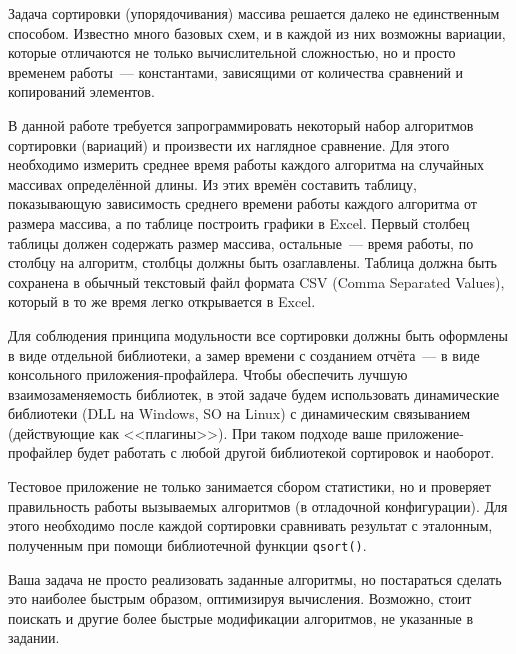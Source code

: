
Задача сортировки (упорядочивания) массива решается далеко не единственным способом. Известно много
базовых схем, и в каждой из них возможны вариации, которые отличаются не только вычислительной
сложностью, но и просто временем работы~--- константами, зависящими от количества сравнений и
копирований элементов.

В данной работе требуется запрограммировать некоторый набор алгоритмов сортировки (вариаций) и
произвести их наглядное сравнение. Для этого необходимо измерить среднее время работы каждого
алгоритма на случайных массивах определённой длины. Из этих времён составить таблицу, показывающую
зависимость среднего времени работы каждого алгоритма от размера массива, а по таблице построить
графики в Excel. Первый столбец таблицы должен содержать размер массива, остальные~--- время работы,
по столбцу на алгоритм, столбцы должны быть озаглавлены. Таблица должна быть сохранена в обычный
текстовый файл формата CSV (Comma Separated Values), который в то же время легко открывается в
Excel.

Для соблюдения принципа модульности все сортировки должны быть оформлены в виде отдельной
библиотеки, а замер времени с созданием отчёта~--- в виде консольного приложения-профайлера. Чтобы
обеспечить лучшую взаимозаменяемость библиотек, в этой задаче будем использовать динамические
библиотеки (DLL на Windows, SO на Linux) с динамическим связыванием (действующие как <<плагины>>).
При таком подходе ваше приложение-профайлер будет работать с любой другой библиотекой сортировок и
наоборот.

Тестовое приложение не только занимается сбором статистики, но и проверяет правильность работы
вызываемых алгоритмов (в отладочной конфигурации). Для этого необходимо после каждой сортировки
сравнивать результат с эталонным, полученным при помощи библиотечной функции \texttt{qsort()}.

Ваша задача не просто реализовать заданные алгоритмы, но постараться сделать это наиболее быстрым
образом, оптимизируя вычисления. Возможно, стоит поискать и другие более быстрые модификации
алгоритмов, не указанные в задании.


\zzsectionCOMMENTS


